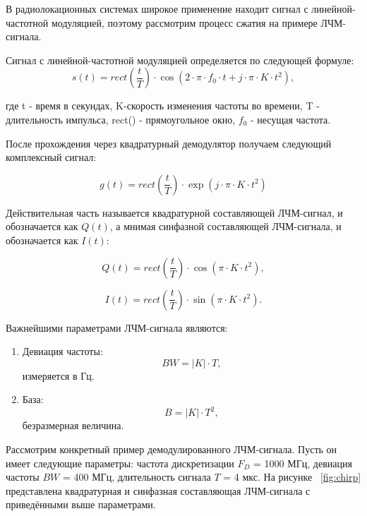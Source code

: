 В радиолокационных системах широкое применение находит сигнал с линейной-частотной модуляцией, поэтому рассмотрим процесс сжатия на примере ЛЧМ-сигнала.

Сигнал с линейной-частотной модуляцией определяется по следующей формуле:
\begin{equation}	
	s(t) = rect(\frac{t}{T}) \cdot \cos(2 \cdot \pi \cdot f_0 \cdot t + j \cdot \pi \cdot K \cdot t^{2}),
\end{equation}

где t - время в секундах, K-скорость изменения частоты во времени, T - длительность импульса, rect() - прямоугольное окно, \(f_0\) - несущая частота.

После прохождения через квадратурный демодулятор получаем следующий комплексный сигнал:

\begin{equation}	
	g(t) = rect(\frac{t}{T}) \cdot \exp(j \cdot \pi \cdot K \cdot t^{2})
\end{equation}

Действительная часть называется квадратурной
составляющей ЛЧМ-сигнал, и обозначается как \(Q(t)\), а мнимая 
синфазной составляющей ЛЧМ-сигнала, и обозначается как \(I(t)\):

\begin{equation}	
	Q(t) = rect(\frac{t}{T}) \cdot \cos(\pi \cdot K \cdot t^{2}),
\end{equation}

\begin{equation}	
	I(t) = rect(\frac{t}{T}) \cdot \sin(\pi \cdot K \cdot t^{2}).
\end{equation}

Важнейшими параметрами ЛЧМ-сигнала являются:

\begin{enumerate}
	\item Девиация частоты: 
\begin{equation}
	BW = |K| \cdot T, 
\end{equation}
измеряется в Гц.
	\item База: 
\begin{equation}
	B = |K| \cdot T^2, 
\end{equation}
безразмерная величина.
\end{enumerate}

Рассмотрим конкретный пример демодулированного ЛЧМ-сигнала. Пусть он имеет следующие параметры: частота дискретизации \(F_{D}\) = 1000 МГц, девиация частоты \(BW\) = 400 МГц, длительность сигнала \(T\) = 4 мкс. На рисунке ~\ref{fig:chirp} представлена квадратурная и синфазная составляющая ЛЧМ-сигнала с приведёнными выше параметрами. 

